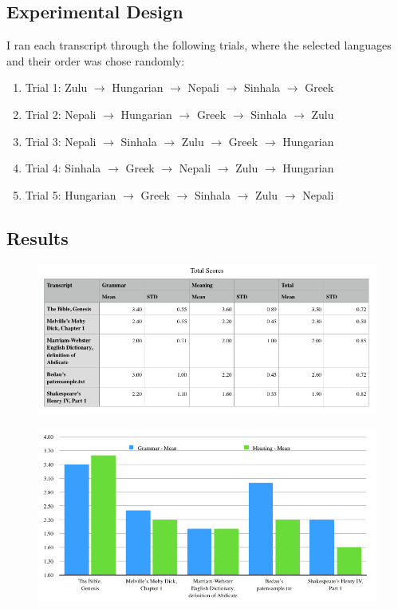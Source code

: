 \documentclass{article}
\begin{document}
\newpage
\subsection{Experimental Design}


I ran each transcript through the following trials, where the selected languages and their order was chose randomly:




\begin{enumerate}
\item[] Trial 1: Zulu $\rightarrow$ Hungarian $\rightarrow$ Nepali $\rightarrow$ Sinhala $\rightarrow$ Greek
\item[] Trial 2: Nepali $\rightarrow$ Hungarian $\rightarrow$ Greek $\rightarrow$ Sinhala $\rightarrow$ Zulu
\item[] Trial 3: Nepali $\rightarrow$ Sinhala $\rightarrow$ Zulu $\rightarrow$ Greek $\rightarrow$ Hungarian
\item[] Trial 4: Sinhala $\rightarrow$ Greek $\rightarrow$ Nepali $\rightarrow$ Zulu $\rightarrow$ Hungarian
\item[] Trial 5: Hungarian $\rightarrow$ Greek $\rightarrow$ Sinhala $\rightarrow$ Zulu $\rightarrow$ Nepali
\end{enumerate}

\subsection{Results}
\begin{figure}[h]
\centering
\includegraphics[width=15cm,keepaspectratio]{images/exp2-results-table.png}
\end{figure}

\begin{figure}[h]
\centering
\includegraphics[width=15cm,keepaspectratio]{images/exp2-results-chart.png}
\end{figure}
\end{document}
